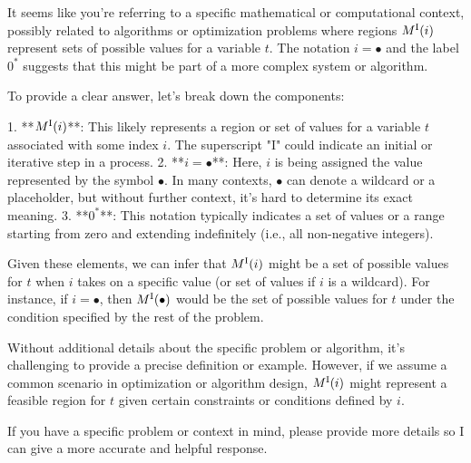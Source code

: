 It seems like you're referring to a specific mathematical or computational context, possibly related to algorithms or optimization problems where regions \( M^{\rm I}(i) \) represent sets of possible values for a variable \( t \). The notation \( i = \bullet \) and the label \( 0^* \) suggests that this might be part of a more complex system or algorithm.

To provide a clear answer, let's break down the components:

1. **\( M^{\rm I}(i) \)**: This likely represents a region or set of values for a variable \( t \) associated with some index \( i \). The superscript "I" could indicate an initial or iterative step in a process.
2. **\( i = \bullet \)**: Here, \( i \) is being assigned the value represented by the symbol \( \bullet \). In many contexts, \( \bullet \) can denote a wildcard or a placeholder, but without further context, it's hard to determine its exact meaning.
3. **\( 0^* \)**: This notation typically indicates a set of values or a range starting from zero and extending indefinitely (i.e., all non-negative integers).

Given these elements, we can infer that \( M^{\rm I}(i) \) might be a set of possible values for \( t \) when \( i \) takes on a specific value (or set of values if \( i \) is a wildcard). For instance, if \( i = \bullet \), then \( M^{\rm I}(\bullet) \) would be the set of possible values for \( t \) under the condition specified by the rest of the problem.

Without additional details about the specific problem or algorithm, it's challenging to provide a precise definition or example. However, if we assume a common scenario in optimization or algorithm design, \( M^{\rm I}(i) \) might represent a feasible region for \( t \) given certain constraints or conditions defined by \( i \).

If you have a specific problem or context in mind, please provide more details so I can give a more accurate and helpful response.